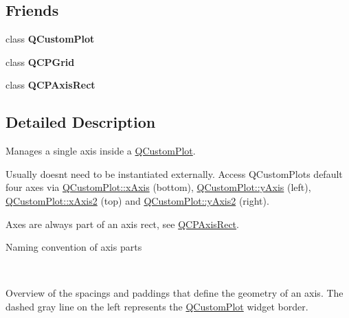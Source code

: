 \subsection*{Friends}
\begin{DoxyCompactItemize}
\item 
class {\bfseries Q\+Custom\+Plot}\hypertarget{class_q_c_p_axis_a1cdf9df76adcfae45261690aa0ca2198}{}\label{class_q_c_p_axis_a1cdf9df76adcfae45261690aa0ca2198}

\item 
class {\bfseries Q\+C\+P\+Grid}\hypertarget{class_q_c_p_axis_a061e177f585549fc31f780852e2bd6fe}{}\label{class_q_c_p_axis_a061e177f585549fc31f780852e2bd6fe}

\item 
class {\bfseries Q\+C\+P\+Axis\+Rect}\hypertarget{class_q_c_p_axis_acbf20ecb140f66c5fd1bc64ae0762990}{}\label{class_q_c_p_axis_acbf20ecb140f66c5fd1bc64ae0762990}

\end{DoxyCompactItemize}


\subsection{Detailed Description}
Manages a single axis inside a \hyperlink{class_q_custom_plot}{Q\+Custom\+Plot}. 

Usually doesn\textquotesingle{}t need to be instantiated externally. Access Q\+Custom\+Plot\textquotesingle{}s default four axes via \hyperlink{class_q_custom_plot_a9a79cd0158a4c7f30cbc702f0fd800e4}{Q\+Custom\+Plot\+::x\+Axis} (bottom), \hyperlink{class_q_custom_plot_af6fea5679725b152c14facd920b19367}{Q\+Custom\+Plot\+::y\+Axis} (left), \hyperlink{class_q_custom_plot_ada41599f22cad901c030f3dcbdd82fd9}{Q\+Custom\+Plot\+::x\+Axis2} (top) and \hyperlink{class_q_custom_plot_af13fdc5bce7d0fabd640f13ba805c0b7}{Q\+Custom\+Plot\+::y\+Axis2} (right).

Axes are always part of an axis rect, see \hyperlink{class_q_c_p_axis_rect}{Q\+C\+P\+Axis\+Rect}.  \begin{center}Naming convention of axis parts\end{center}  ~\newline
  \begin{center}Overview of the spacings and paddings that define the geometry of an axis. The dashed gray line on the left represents the \hyperlink{class_q_custom_plot}{Q\+Custom\+Plot} widget border.\end{center}  

